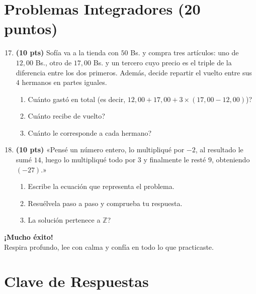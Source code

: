 \documentclass[12pt, letterpaper]{article}
\newcommand{\Z}{\mathbb{Z}}
\begin{document}
\section{Problemas Integradores (20 puntos)}

\begin{enumerate}[leftmargin=*]
  \setcounter{enumi}{16}
  \item \textbf{(10 pts)} Sofía va a la tienda con $50$ Bs. y compra tres artículos: uno de $12{,}00$ Bs., otro de $17{,}00$ Bs. y un tercero cuyo precio es el triple de la diferencia entre los dos primeros. Además, decide repartir el vuelto entre sus $4$ hermanos en partes iguales.
        \begin{enumerate}[label=\alph*)]
          \item \textquestiondown Cuánto gastó en total (es decir, $12{,}00 + 17{,}00 + 3 \times (17{,}00 - 12{,}00)$)?
          \item \textquestiondown Cuánto recibe de vuelto?
          \item \textquestiondown Cuánto le corresponde a cada hermano?
        \end{enumerate}

  \item \textbf{(10 pts)} «Pensé un número entero, lo multipliqué por $-2$, al resultado le sumé $14$, luego lo multipliqué todo por $3$ y finalmente le resté $9$, obteniendo $(-27)$.»
        \begin{enumerate}[label=\alph*)]
          \item Escribe la ecuación que representa el problema.
          \item Resuélvela paso a paso y comprueba tu respuesta.
          \item \textquestiondown La solución pertenece a $\Z$?
        \end{enumerate}
\end{enumerate}

\vspace{14pt}
\begin{center}
  {\Large\bfseries\color{mwprimario} ¡Mucho éxito!}\\[4pt]
  {\large\color{gray} Respira profundo, lee con calma y confía en todo lo que practicaste.}
\end{center}

\ifmwclaves
  \section{Clave de Respuestas}
\end{document}
